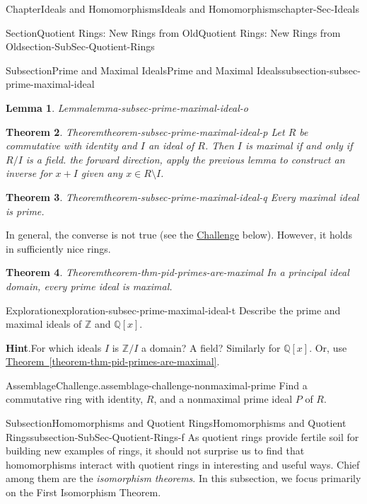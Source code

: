 \documentclass[oneside,10pt,]{book}
\newcommand{\blocktitlefont}{\relax}
\newcommand{\xreffont}{\relax}
\numberwithin{equation}{section}
\def\Z{{\mathbb Z}}
\def\Q{{\mathbb Q}}
\newtheorem{theorem}{Theorem}[section]
\newtheorem{lemma}[theorem]{Lemma}
\begin{document}
\begin{chapterptx}{Chapter}{Ideals and Homomorphisms}{}{Ideals and Homomorphisms}{}{}{chapter-Sec-Ideals}
\begin{sectionptx}{Section}{Quotient Rings: New Rings from Old}{}{Quotient Rings: New Rings from Old}{}{}{section-SubSec-Quotient-Rings}
\begin{subsectionptx}{Subsection}{Prime and Maximal Ideals}{}{Prime and Maximal Ideals}{}{}{subsection-subsec-prime-maximal-ideal}
\begin{lemma}{Lemma}{}{}{lemma-subsec-prime-maximal-ideal-o}
\end{lemma}
\begin{theorem}{Theorem}{}{}{theorem-subsec-prime-maximal-ideal-p}%
Let \(R\) be commutative with identity and \(I\) an ideal of \(R\). Then \(I\) is maximal if and only if \(R/I\) is a field.%
\noindentFor the forward direction, apply the previous lemma to construct an inverse for \(x+I\) given any \(x\in R\setminus I\).%
\end{theorem}
\begin{theorem}{Theorem}{}{}{theorem-subsec-prime-maximal-ideal-q}%
Every maximal ideal is prime.%
\end{theorem}
In general, the converse is not true (see the \hyperref[assemblage-challenge-nonmaximal-prime]{Challenge} below). However, it holds in sufficiently nice rings.%
\begin{theorem}{Theorem}{}{}{theorem-thm-pid-primes-are-maximal}%
In a principal ideal domain, every prime ideal is maximal.%
\end{theorem}
\begin{exploration}{Exploration}{}{exploration-subsec-prime-maximal-ideal-t}%
Describe the prime and maximal ideals of \(\Z\) and \(\Q[x]\).%
\par\smallskip%
\noindent\textbf{\blocktitlefont Hint}.\hypertarget{hint-subsec-prime-maximal-ideal-t-b}{}\quad{}For which ideals \(I\) is \(\Z/I\) a domain? A field? Similarly for \(\Q[x]\). Or, use \hyperref[theorem-thm-pid-primes-are-maximal]{Theorem~{\xreffont\ref{theorem-thm-pid-primes-are-maximal}}}.\end{exploration}%
\begin{assemblage}{Assemblage}{Challenge.}{assemblage-challenge-nonmaximal-prime}%
Find a commutative ring with identity, \(R\), and a nonmaximal prime ideal \(P\) of \(R\).%
\end{assemblage}
\end{subsectionptx}
%
%
\typeout{************************************************}
\typeout{************************************************}
%
\begin{subsectionptx}{Subsection}{Homomorphisms and Quotient Rings}{}{Homomorphisms and Quotient Rings}{}{}{subsection-SubSec-Quotient-Rings-f}
As quotient rings provide fertile soil for building new examples of rings, it should not surprise us to find that homomorphisms interact with quotient rings in interesting and useful ways. Chief among them are the \emph{isomorphism theorems}. In this subsection, we focus primarily on the First Isomorphism Theorem.%

\end{subsectionptx}
\end{sectionptx}
\end{chapterptx}
\end{document}
